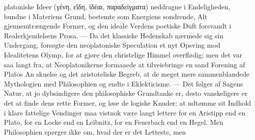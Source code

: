 \documentclass[12pt]{book}
\newcommand{\opage}[1]{\marginnote{\footnotesize\textit{[#1]}}}
\begin{document}
platoniske Ideer (γένη, εἴδη, ἰδέαι, παραδείγματα) neddragne i Endeligheden, bundne i
Materiens Grund, bestemte som Energiens sondrende, Alt gjennemtrængende Former, og den
ideale Verdens poetiske Duft forsvandt i Realerkjendelsens Prosa. --- Da det klassiske
Hedenskab nærmede sig sin Undergang, forsøgte den neoplatoniske Speculation et nyt
Opsving mod Idealitetens Olymp, for at gjøre den christelige Himmel overflødig; men det var
saa langt fra, at Neoplatonikerne formaaede at tilveiebringe en sand Forening af Platos
An%
\opage{188}skuelse og det aristoteliske Begreb, at de meget mere sammenblandede Mythologien med
Philosophien og endte i Eklekticisme. --- Det følger af Sagens Natur, at jo dybsindigere
den philosophiske Grundtanke er, desto vanskeligere er det at finde dens rette Former, og
løse de logiske Knuder; at udtømme sit Indhold i klare fattelige Vendinger maa vistnok
være langt lettere for en Aristipp end en Plato, for en Locke end en Leibnitz, for en
Feuerbach end en Hegel. Men Philosophien spørger ikke om, hvad der er det Letteste, men
\end{document}
